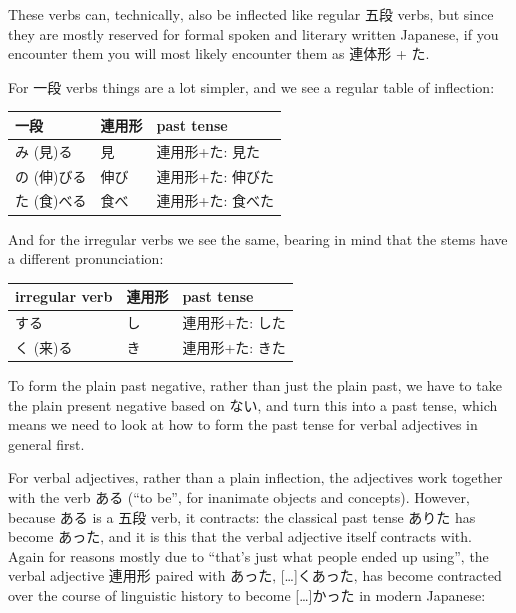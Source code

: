 \documentclass[11pt, b5paper, twoside, openright, onecolumn]{book}
\makeatletter
\newcommand*{\rtrubystack}[2]{{\relscale{0.5}%
  \begin{tabular}[b]{@{}c@{}}%
    {#1}\\%
    {\textscale{2}{#2}}%
  \end{tabular}}%
}
\DeclareRobustCommand*{\rtruby}[2]{%
  \mbox{%
    \setlength{\parskip}{0ex}%
    \BeginAccSupp{method=pdfstringdef,ActualText={#1}}%
      \rtrubystack{\phantom{#2}}{#1}%
      \llap{%
        \rtrubystack{#2}{\phantom{#1}}%
      }%
    \EndAccSupp{}%
  }%
}
\renewcommand*{\rtruby}[2]{#2 (#1)}%
\newenvironment{mytabular}[1]{\noindent\hspace{0.4in}
\begin{tabular}[h]{#1}}{\end{tabular}}
\makeatother
\begin{document}
These verbs can‚ technically‚ also be inflected like regular 五段 verbs‚ but since they are mostly reserved for formal spoken and literary written Japanese‚ if you encounter them you will most likely encounter them as 連体形 + た.

For 一段 verbs things are a lot simpler‚ and we see a regular table of inflection:

\vspace{0.5cm}
\smaller
\begin{mytabular}{| l  l  l |}\hline 
\rule{0pt}{2.4ex}一段 & 連用形 & past tense\\ 
\hline
\rule{0pt}{3.6ex}\rtruby{見}{み}る & 見 & 連用形+た: 見た\\ 
\rule{0pt}{3.6ex}\rtruby{伸}{の}びる & 伸び & 連用形+た: 伸びた\\ 
\rule{0pt}{3.6ex}\rtruby{食}{た}べる & 食べ & 連用形+た: 食べた\\ 
\hline 
\end{mytabular}
\larger
\vspace{0.5cm}


And for the irregular verbs we see the same‚ bearing in mind that the stems have a different pronunciation:

\vspace{0.5cm}
\smaller
\begin{mytabular}{| l  l  l |}\hline 
\rule{0pt}{2.4ex}irregular verb & 連用形 & past tense\\ 
\hline
\rule{0pt}{2.4ex}する & し & 連用形+た: した\\ 
\rule{0pt}{3.6ex}\rtruby{来}{く}る & き & 連用形+た: きた\\ 
\hline 
\end{mytabular}
\larger
\vspace{0.5cm}


To form the plain past negative‚ rather than just the plain past‚ we have to take the plain present negative based on ない‚ and turn this into a past tense‚ which means we need to look at how to form the past tense for verbal adjectives in general first.

For verbal adjectives‚ rather than a plain inflection‚ the adjectives work together with the verb ある (“to be”‚ for inanimate objects and concepts). However‚ because ある is a 五段 verb‚ it contracts: the classical past tense ありた has become あった‚ and it is this that the verbal adjective itself contracts with. Again for reasons mostly due to “that’s just what people ended up using”‚ the verbal adjective 連用形 paired with あった‚ […]くあった‚ has become contracted over the course of linguistic history to become […]かった in modern Japanese:
\end{document}
